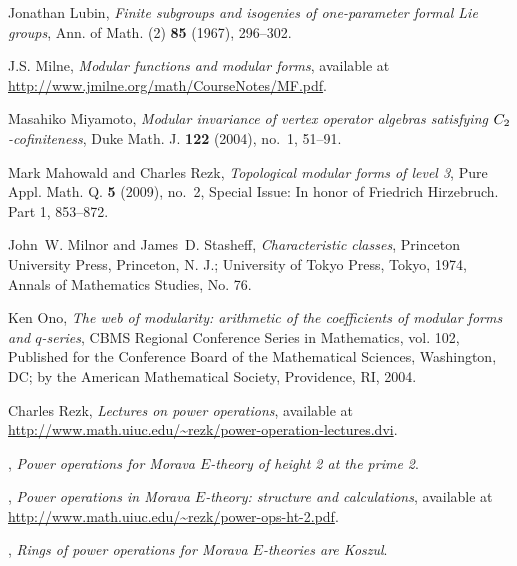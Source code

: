 \documentclass{gtpart}
\theoremstyle{definition}
\theoremstyle{remark}
\renewcommand{\=}{\approx}
\renewcommand{\-}{\sim}
\numberwithin{equation}{section}
\numberwithin{thm}{section}
\begin{document}
\begin{thebibliography}
Jonathan Lubin, \emph{Finite subgroups and isogenies of one-parameter formal
  {L}ie groups}, Ann. of Math. (2) \textbf{85} (1967), 296--302. 

J.S. Milne, \emph{Modular functions and modular forms}, 
  available at \href{http://www.jmilne.org/math/CourseNotes/MF.pdf}{http://www.jmilne.org\linebreak/math/CourseNotes/MF.pdf}.

Masahiko Miyamoto, \emph{Modular invariance of vertex operator algebras
  satisfying {$C\sb 2$}-cofiniteness}, Duke Math. J. \textbf{122} (2004),
  no.~1, 51--91. 

Mark Mahowald and Charles Rezk, \emph{Topological modular forms of level 3},
  Pure Appl. Math. Q. \textbf{5} (2009), no.~2, Special Issue: In honor of
  Friedrich Hirzebruch. Part 1, 853--872. 

John~W. Milnor and James~D. Stasheff, \emph{Characteristic classes}, Princeton
  University Press, Princeton, N. J.; University of Tokyo Press, Tokyo, 1974,
  Annals of Mathematics Studies, No. 76. 

Ken Ono, \emph{The web of modularity: arithmetic of the coefficients of modular
  forms and {$q$}-series}, CBMS Regional Conference Series in Mathematics, vol.
  102, Published for the Conference Board of the Mathematical Sciences,
  Washington, DC; by the American Mathematical Society, Providence, RI, 2004.

Charles Rezk, \emph{Lectures on power operations}, 
  available at \href{http://www.math.uiuc.edu/~rezk/power-operation-lectures.dvi}{http://www.math.uiuc.edu\linebreak/\textasciitilde rezk/power-operation-lectures.dvi}.

\bysame, \emph{Power operations for {M}orava {$E$}-theory of height 2 at the
  prime 2}. 

\bysame, \emph{Power operations in {M}orava {$E$}-theory: structure and
  calculations}, 
  available at \href{http://www.math.uiuc.edu/~rezk/power-ops-ht-2.pdf}{http://www.math.uiuc.edu/\textasciitilde rezk/power-ops-ht-2.pdf}.

\bysame, \emph{Rings of power operations for {M}orava {$E$}-theories are
  {K}oszul}. 


\end{thebibliography}
\end{document}
